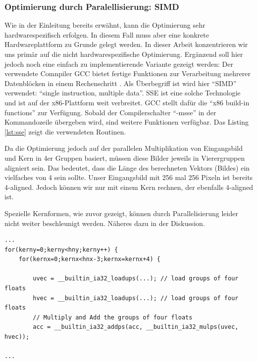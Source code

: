 \documentclass[a4paper,12pt]{article}
\begin{document}
\subsubsection{Optimierung durch Paralellisierung: SIMD}\label{chp:simd}
Wie in der Einleitung bereits erwähnt, kann die Optimierung sehr
hardwarespezifisch erfolgen. In diesem Fall muss aber eine konkrete
Hardwareplattform zu Grunde gelegt werden. In dieser Arbeit konzentrieren wir
uns primär auf die nicht hardwarespezifische Optimierung. Ergänzend soll hier
jedoch noch eine einfach zu implementierende Variante gezeigt werden: Der
verwendete Comnpiler GCC bietet fertige Funktionen zur Verarbeitung mehrerer
Datenblöcken in einem Rechenschritt \cite{gcc}. Als Überbegriff ist wird hier
"`SIMD"' verwendet: "`single instruction, multiple data"'. SSE ist eine solche
Technologie und ist auf der x86-Plattform weit verbreitet. GCC stellt dafür die
"`x86 build-in functions"' zur Verfügung. Sobald der Compilerschalter "`-msse"'
in der Kommandozeile übergeben wird, sind weitere Funktionen verfügbar. Das
Listing \ref{lst:sse} zeigt die verwendeten Routinen.

Da die Optimierung jedoch auf der parallelen Multiplikation von Eingangsbild und
Kern in 4er Gruppen basiert, müssen diese Bilder jeweils in Vierergruppen
aligniert sein. Das bedeutet, dass die Länge des berechneten Vektors (Bildes)
ein vielfaches von 4 sein sollte.
 Unser Eingangsbild mit 256 mal 256 Pixeln ist bereits 4-aligned.
Jedoch können wir nur mit einem Kern rechnen, der ebenfalls 4-aligned ist. 

Spezielle Kernformen, wie zuvor gezeigt, können durch Parallelisierung leider
nicht weiter beschleunigt werden. Näheres dazu in der Diskussion.


\begin{lstlisting}[float,caption={verwendete x86
build-in-SSE-Erweiterungen},label=lst:sse] ...
for(kerny=0;kerny<hny;kerny++) {
	for(kernx=0;kernx<hnx-3;kernx=kernx+4) {
		
		uvec = __builtin_ia32_loadups(...); // load groups of four floats
		hvec = __builtin_ia32_loadups(...); // load groups of four floats
		// Multiply and Add the groups of four floats
		acc = __builtin_ia32_addps(acc, __builtin_ia32_mulps(uvec, hvec));
 
...
\end{lstlisting}
 
\end{document}
